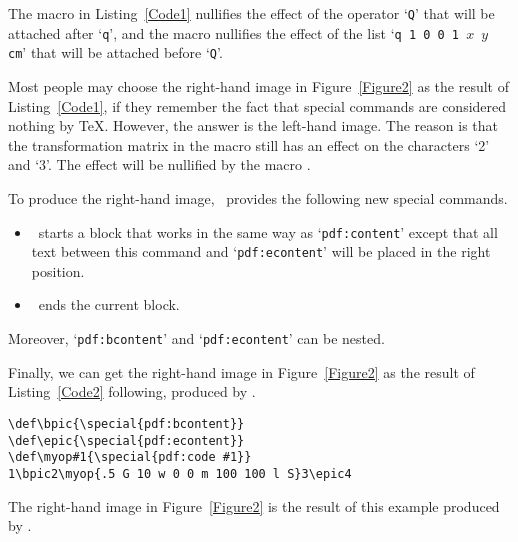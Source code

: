\documentclass[final]{ltugboat}
\let\DPX\DVIPDFMx
\begin{document}
The macro  in Listing~\ref{Code1} nullifies the effect of the operator `\texttt{Q}' that will be attached after `\texttt{q}', and the macro  nullifies the effect of the list `\texttt{q 1 0 0 1 $x$ $y$ cm}' that will be attached before `\texttt{Q}'.

Most people may choose the right-hand image in Figure~\ref{Figure2} as the result of Listing~\ref{Code1}, if they remember the fact that special commands are considered nothing by \TeX. However, the answer is the left-hand image.
The reason is that the transformation matrix in the macro  still has an effect on the characters `2' and `3'. The effect will be nullified by the macro .

To produce the right-hand image, \DPX\ provides the following new special commands.

\begin{itemize}
\item{} \ starts a block that works in the same way as `\texttt{pdf:content}' except that all text between this command and `\texttt{pdf:econtent}' will be placed in the right position.
\item{} \ ends the current block.
\end{itemize}

\noindent
Moreover, `\texttt{pdf:bcontent}' and `\texttt{pdf:econtent}' can be nested.

Finally, we can get the right-hand image in Figure~\ref{Figure2} as the result of Listing~\ref{Code2} following, produced by \DPX.

\begin{table}[h] 
\hfuzz=5pt
\fontsize{9pt}{11pt}\selectfont
\begin{verbatim}
\def\bpic{\special{pdf:bcontent}}
\def\epic{\special{pdf:econtent}}
\def\myop#1{\special{pdf:code #1}}
1\bpic2\myop{.5 G 10 w 0 0 m 100 100 l S}3\epic4
\end{verbatim}
\caption{The right-hand image in Figure~\ref{Figure2} is the result of this example produced by \DPX.}
\label{Code2}
\end{table}
\end{document}
